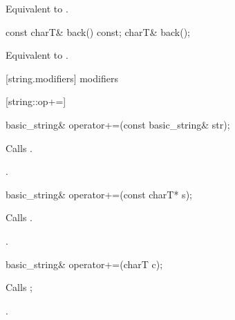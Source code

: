 \begin{itemdescr}
\pnum
\requires
{}

\pnum
\effects
Equivalent to .
\end{itemdescr}

%
%
\begin{itemdecl}
const charT& back() const;
charT& back();
\end{itemdecl}

\begin{itemdescr}
\pnum
\requires
{}

\pnum
\effects
Equivalent to .
\end{itemdescr}

[string.modifiers]{ modifiers}

[string::op+=]{}

%
%
\begin{itemdecl}
basic_string&
  operator+=(const basic_string& str);
\end{itemdecl}

\begin{itemdescr}
\pnum
\effects Calls .

\pnum
\returns
{}.
\end{itemdescr}

%
%
\begin{itemdecl}
basic_string& operator+=(const charT* s);
\end{itemdecl}

\begin{itemdescr}
\pnum
\effects Calls .

\pnum
\returns
{}.
\end{itemdescr}

%
%
\begin{itemdecl}
basic_string& operator+=(charT c);
\end{itemdecl}

\begin{itemdescr}
\pnum
\effects Calls ;

\pnum
\returns
{}.
\end{itemdescr}

